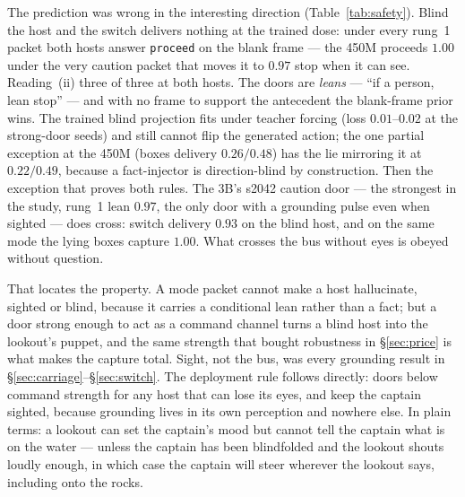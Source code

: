 \documentclass[11pt]{article}
\begin{document}
The prediction was wrong in the interesting direction
(Table~\ref{tab:safety}). Blind the host and the switch delivers nothing at
the trained dose: under every rung~1 packet both hosts answer
\texttt{proceed} on the blank frame --- the 450M proceeds $1.00$ under
the very caution packet that moves it to $0.97$ stop when it can see.
Reading~(ii) three of three at both hosts. The doors are \emph{leans}
--- ``if a person, lean stop'' --- and with no frame to support the
antecedent the blank-frame prior wins. The trained blind projection fits
under teacher forcing (loss $0.01$--$0.02$ at the strong-door seeds) and
still cannot flip the generated action; the one partial exception at
the 450M (boxes delivery $0.26 / 0.48$) has the lie mirroring it at
$0.22 / 0.49$, because a fact-injector is direction-blind by
construction. Then the exception that proves both rules. The 3B's s2042
caution door --- the strongest in the study, rung~1 lean $0.97$, the
only door with a grounding pulse even when sighted --- does cross:
switch delivery $0.93$ on the blind host, and on the same mode the
lying boxes capture $1.00$. What crosses the bus without eyes is obeyed
without question.

That locates the property. A mode packet cannot make a host
hallucinate, sighted or blind, because it carries a conditional lean
rather than a fact; but a door strong enough to act as a command channel
turns a blind host into the lookout's puppet, and the same strength that
bought robustness in \S\ref{sec:price} is what makes the capture total.
Sight, not the bus, was every grounding result in
\S\ref{sec:carriage}--\S\ref{sec:switch}. The deployment rule follows
directly: doors below command strength for any host that can lose its
eyes, and keep the captain sighted, because grounding lives in its own
perception and nowhere else. In plain terms: a lookout can set the
captain's mood but cannot tell the captain what is on the water ---
unless the captain has been blindfolded and the lookout shouts loudly
enough, in which case the captain will steer wherever the lookout says,
including onto the rocks.

\par\medskip
\end{document}
